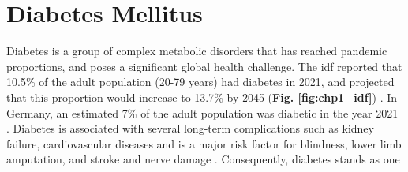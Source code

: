 


\section{Diabetes Mellitus}  %
\label{sec:diabetes}
Diabetes is a group of complex metabolic disorders that has reached pandemic proportions, and poses a significant global health challenge. %
The \gls{idf} reported that 10.5\% of the adult population (20-79 years) had diabetes in 2021, and projected that this proportion would increase to 13.7\% by 2045 (\textbf{Fig. \ref{fig:chp1_idf}}) \textbf{\cite{home_idf_nodate}}. In Germany, an estimated 7\% of the adult population was diabetic in the year 2021 \textbf{\cite{noauthor_germany_nodate}}. Diabetes is associated with several long-term complications such as kidney failure, cardiovascular diseases and is a major risk factor for blindness, lower limb amputation,%
 and stroke and nerve damage \textbf{\cite{ashcroft_diabetes_2012,the_emerging_risk_factors_collaboration_diabetes_2010,leon_diabetes_2015}}. Consequently, diabetes stands as one \\

